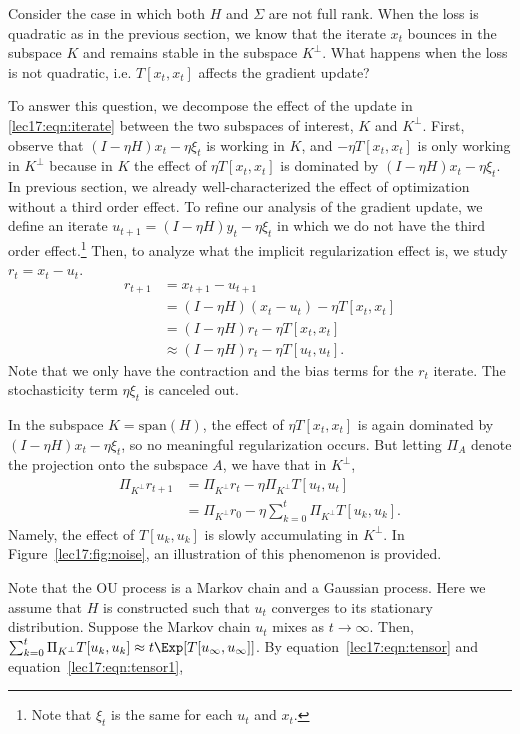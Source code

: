 Consider the case in which both $H$ and $\Sigma$ are not full rank. When the loss is quadratic as in the previous section, we know that the iterate $x_t$ bounces in the subspace $K$ and remains stable in the subspace $K^\perp$. What happens when the loss is not quadratic, i.e. $T[x_t,x_t]$ affects the gradient update? 

To answer this question, we decompose the effect of the update in \eqref{lec17:eqn:iterate} between the two subspaces of interest, $K$ and $K^\perp$. First, observe that $(I-\eta H)x_t - \eta \xi_t$ is working in $K$, and $- \eta T [x_t,x_t]$ is only working in $K^\perp$ because in $K$ the effect of $\eta T [x_t,x_t]$ is dominated by $(I-\eta H)x_t - \eta \xi_t$. In previous section, we already well-characterized the effect of optimization without a third order effect. To refine our analysis of the gradient update, we define an iterate $u_{t+1} = (I - \eta H)y_t - \eta \xi_t$ in which we do not have the third order effect.\footnote{Note that $\xi_t$ is the same for each $u_t$ and $x_t$.} Then, to analyze what the implicit regularization effect is, we study $r_t = x_t - u_t$.
\begin{align*}
r_{t + 1} &= x_{t+1} - u_{t+1}\\
&= (I-\eta H)(x_t - u_t) - \eta T[x_t,x_t]\\
&= (I-\eta H)r_t - \eta T[x_t,x_t]\\
&\approx (I-\eta H)r_t - \eta T[u_t,u_t].
\end{align*}
Note that we only have the contraction and the bias terms for the $r_t$ iterate. The stochasticity term $\eta \xi_t$ is canceled out. 

In the subspace $K = \text{span}(H)$, the effect of $\eta T [x_t,x_t]$ is again dominated by $(I-\eta H)x_t - \eta \xi_t$, so no meaningful regularization occurs. But letting $\Pi_{A}$ denote the projection onto the subspace $A$, we have that in $K^\perp$,
\begin{align}
\Pi_{K^\perp}r_{t+1} &= \Pi_{K^\perp}r_t - \eta \Pi_{K^\perp} T[u_t,u_t]\\
&=\Pi_{K^\perp}r_0 - \eta \sum_{k=0}^{t}\Pi_{K^\perp}T[u_k,u_k].
\end{align}
Namely, the effect of $T[u_k,u_k]$ is slowly accumulating in ${K^\perp}$. In Figure~\ref{lec17:fig:noise}, an illustration of this phenomenon is provided.

Note that the OU process is a Markov chain and a Gaussian process. Here we assume that $H$ is constructed such that $u_t$ converges to its stationary distribution. Suppose the Markov chain $u_t$ mixes as $t\rightarrow \infty$. Then, $\sum_{k=0}^{t}\Pi_{K^\perp}T[u_k,u_k] \approx t \Exp [T[u_\infty,u_\infty]]$. By equation~\eqref{lec17:eqn:tensor} and equation~\eqref{lec17:eqn:tensor1},

